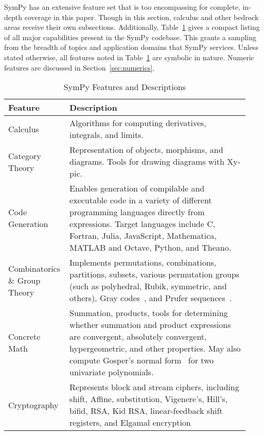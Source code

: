 
SymPy has an extensive feature set that is too encompassing for complete, in-depth
coverage in this paper. Though in this section, calculus and other bedrock areas receive
their own subsections. Additionally,
Table~\ref{features-table} gives a compact listing of all major capabilities
present in the SymPy codebase. This grants a sampling from the breadth of
topics and application domains that SymPy services. Unless stated otherwise,
all features noted in Table~\ref{features-table} are symbolic in nature.
Numeric features are discussed in Section~\ref{sec:numerics}.

\begin{longtable}[htbc]{p{0.20\linewidth}p{0.73\linewidth}}
\caption{SymPy Features and Descriptions\label{features-table}}\\
\toprule
\textbf{Feature} & \textbf{Description} \\
\midrule
Calculus & Algorithms for computing derivatives, integrals, and limits.\\

Category Theory & Representation of objects, morphisms, and diagrams. Tools
for drawing diagrams with Xy-pic.\\

Code Generation & Enables generation of compilable and executable code in a
variety of different programming languages directly from expressions. Target
languages include C, Fortran, Julia, JavaScript,
Mathematica, MATLAB and Octave, Python, and Theano.\\

Combinatorics \& Group Theory & Implements permutations, combinations,
partitions, subsets, various permutation groups (such as polyhedral, Rubik,
symmetric, and others), Gray codes~\cite{Nijenhuis1978combinatorial},
and Prufer sequences~\cite{biggs1976graph}.\\

Concrete Math & Summation, products, tools for determining whether summation
and product expressions are convergent, absolutely convergent, hypergeometric,
and
other properties. May also compute Gosper's normal form~\cite{petkovvsek1996bak} for two univariate polynomials.\\

Cryptography & Represents block and stream ciphers, including shift, Affine,
substitution, Vigenere's, Hill's, bifid, RSA, Kid RSA,
linear-feedback shift registers, and Elgamal encryption\\


\end{longtable}
